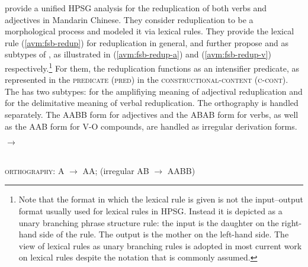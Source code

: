  
 
 
 
 
 
\citet*{FanSongBond2015} provide a unified HPSG analysis for the reduplication of both verbs and adjectives in Mandarin Chinese.
They consider reduplication to be a morphological process and modeled it via lexical rules.
They provide the lexical rule (\ref{avm:fsb-redup}) for reduplication in general,
and further propose  and  as subtypes of , 
as illustrated in (\ref{avm:fsb-redup-a}) and (\ref{avm:fsb-redup-v}) respectively.\footnote{%
  Note that the format in which the lexical rule is given is not the input--output format usually
  used for lexical rules in HPSG. Instead it is depicted as a unary branching phrase structure
  rule: the input is the daughter on the right-hand side of the rule. The output is the mother on
  the left-hand side. The view of lexical rules as unary branching rules is adopted in most current work on
  lexical rules \citep{BC99a,Meurers2001a} despite the notation that is commonly assumed.  
}
For them, the reduplication functions as an intensifier predicate, as represented in the \textsc{predicate (pred)} in the \textsc{constructional-content (c-cont)}.
The  has two subtypes:  for the amplifiying meaning of adjectival reduplication and  for the delimitative meaning of verbal reduplication.
The orthography is handled separately.
The AABB form for adjectives and the ABAB form for verbs, as well as the AAB form for V-O compounds, are handled as irregular derivation forms.


\ea\label{avm:fsb-redup}
$\to$
\z


\ea\label{avm:fsb-redup-a}
\\
\textsc{orthography}: A $\to$ AA; (irregular AB $\to$ AABB)
\z

